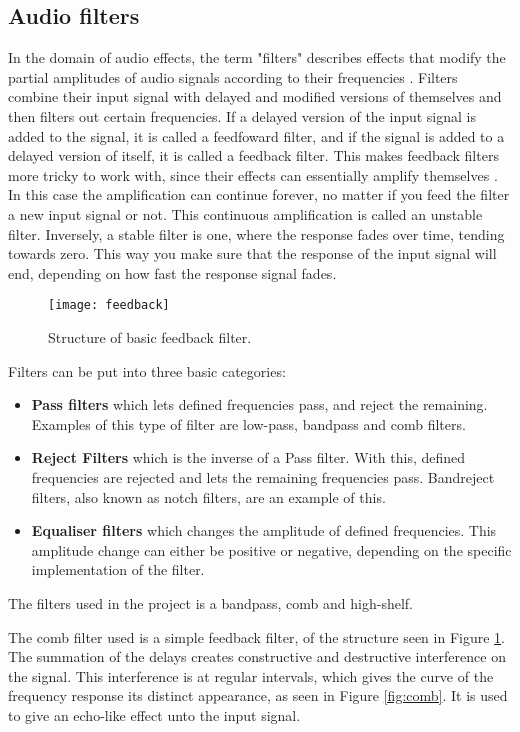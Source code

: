 \subsection{Audio filters}\label{sub:audiofilters}
In the domain of audio effects, the term "filters" describes effects that modify the partial amplitudes of audio signals according to their frequencies \cite{zolzer2011dafx}. Filters combine their input signal with delayed and modified versions of themselves and then filters out certain frequencies. If a delayed version of the input signal is added to the signal, it is called a feedfoward filter, and if the signal is added to a delayed version of itself, it is called a feedback filter. This makes feedback filters more tricky to work with, since their effects can essentially amplify themselves \cite{steiglitz1997digital}. In this case the amplification can continue forever, no matter if you feed the filter a new input signal or not. This continuous amplification is called an unstable filter. Inversely, a stable filter is one, where the response fades over time, tending towards zero. This way you make sure that the response of the input signal will end, depending on how fast the response signal fades.

\begin{figure}
\centering
\texttt{[image: feedback]}
\caption{Structure of basic feedback filter.}
\label{fig:feedback}
\end{figure}

Filters can be put into three basic categories:
\begin{itemize}
\item \textbf{Pass filters} which lets defined frequencies pass, and reject the remaining. Examples of this type of filter are low-pass, bandpass and comb filters.
\item \textbf{Reject Filters} which is the inverse of a Pass filter. With this, defined frequencies are rejected and lets the remaining frequencies pass. Bandreject filters, also known as notch filters, are an example of this.
\item \textbf{Equaliser filters} which changes the amplitude of defined frequencies. This amplitude change can either be positive or negative, depending on the specific implementation of the filter. 
\end{itemize}

The filters used in the project is a bandpass, comb and high-shelf.

The comb filter used is a simple feedback filter, of the structure seen in Figure \ref{fig:feedback}. The summation of the delays creates constructive and destructive interference on the signal. This interference is at regular intervals, which gives the curve of the frequency response its distinct appearance, as seen in Figure \ref{fig:comb}. It is used to give an echo-like effect unto the input signal.

